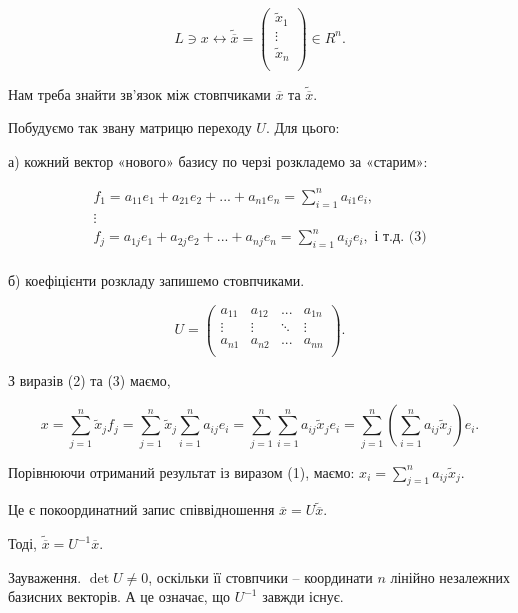 $$L \ni x \leftrightarrow \tilde{\overline{x}} = \begin{pmatrix}
	\tilde{x}_1 \\
	\vdots \\
	\tilde{x}_n \\
\end{pmatrix} \in R^n.$$



Нам треба знайти зв’язок між стовпчиками $\overline{x}$ та $\tilde{\overline{x}}$.

Побудуємо так звану матрицю переходу $U$. Для цього:

а) кожний вектор «нового» базису по черзі розкладемо за «старим»: 

$$\begin{matrix}
	f_1 = a_{11} e_1 + a_{21} e_2 + ... + a_{n1} e_n = \sum\limits_{i=1}^n a_{i1} e_i, \\
	\vdots \\
	f_j = a_{1j} e_1 + a_{2j} e_2 + ... + a_{nj} e_n = \sum\limits_{i=1}^n a_{ij} e_i, \text{ і т.д. (3)} \\
\end{matrix}$$


б) коефіцієнти розкладу запишемо стовпчиками.

$$ U = \begin{pmatrix}
	a_{11} & a_{12} & ...    & a_{1n} \\
	\vdots & \vdots & \ddots & \vdots \\
	a_{n1} & a_{n2} & ...    & a_{nn} \\
\end{pmatrix}. $$

З виразів (2) та (3) маємо,

$$x = \sum\limits_{j=1}^n \tilde{x}_j f_j
= \sum\limits_{j=1}^n \tilde{x}_j \sum\limits_{i=1}^n a_{ij} e_i
= \sum\limits_{j=1}^n \sum\limits_{i=1}^n a_{ij} \tilde{x}_j e_i
= \sum\limits_{j=1}^n \left( \sum\limits_{i=1}^n a_{ij} \tilde{x}_j \right) e_i.$$

Порівнюючи отриманий результат із виразом (1), маємо: $x_i = \sum\limits_{j=1}^n a_{ij} \tilde{x}_j$.

Це є покоординатний запис співвідношення $\overline{x} = U \tilde{\overline{x}}$.

Тоді, $\tilde{\overline{x}} = U^{-1} \overline{x}$.

Зауваження. $\det U \neq 0$, оскільки її стовпчики -- координати $n$ лінійно
незалежних базисних векторів. А це означає, що $U^{-1}$ завжди існує.

